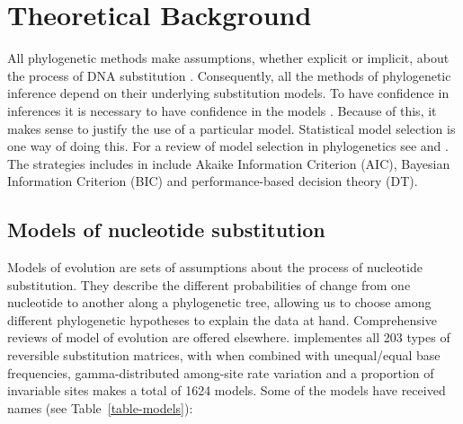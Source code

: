 \section{Theoretical Background}

All phylogenetic methods make assumptions, whether explicit or implicit,
about the process of DNA substitution \citep{Felsenstein-1988}.
Consequently, all the methods of phylogenetic inference depend on their underlying substitution models.
To have confidence in inferences it is necessary to have confidence in the models \citep{Goldman-1993b}.
Because of this, it makes sense to justify the use of a particular model.
Statistical model selection is one way of doing this.
For a review of model selection in phylogenetics see \citet{Sullivan-2005} and \citet{Johnson-2003}.
The strategies includes in \modeltest include Akaike Information Criterion (AIC),
Bayesian Information Criterion (BIC) and performance-based decision theory (DT).


\subsection{Models of nucleotide substitution}

Models of evolution are sets of assumptions about the process of nucleotide substitution.
They describe the different probabilities of change from one nucleotide to another along a phylogenetic tree,
allowing us to choose among different phylogenetic hypotheses to explain the data at hand.
Comprehensive reviews of model of evolution are offered elsewhere.
\modeltest implementes all 203 types of reversible substitution matrices,
with when combined with unequal/equal base frequencies,
gamma-distributed among-site rate variation and a proportion of invariable sites
makes a total of 1624 models.
Some of the models have received names (see Table~\ref{table-models}):

